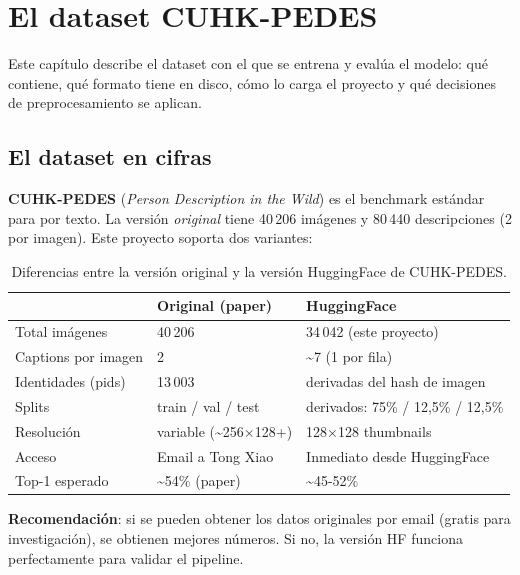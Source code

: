\chapter{El dataset CUHK-PEDES}
\label{cap:dataset}

Este capítulo describe el dataset con el que se entrena y evalúa
el modelo: qué contiene, qué formato tiene en disco, cómo lo
carga el proyecto y qué decisiones de preprocesamiento se
aplican.

\section{El dataset en cifras}

\textbf{CUHK-PEDES} (\emph{Person Description in the Wild})
\cite{li2017personsearch} es el benchmark estándar para
\reid{} por texto. La versión \emph{original} tiene 40\,206
imágenes y 80\,440 descripciones (2 por imagen). Este proyecto
soporta dos variantes:

\begin{table}[H]
\centering
\caption{Diferencias entre la versión original y la versión
HuggingFace de CUHK-PEDES.}
\label{tab:cuhk-versions}
\begin{tabularx}{\textwidth}{lXX}
\toprule
 & \textbf{Original (paper)} & \textbf{HuggingFace} \\
\midrule
Total imágenes
  & 40\,206
  & 34\,042 \footnotesize(este proyecto) \\
Captions por imagen
  & 2
  & \textasciitilde 7 (1 por fila) \\
Identidades (pids)
  & 13\,003
  & derivadas del hash de imagen \\
Splits
  & train / val / test
  & derivados: 75\% / 12,5\% / 12,5\% \\
Resolución
  & variable (\textasciitilde 256×128+)
  & 128×128 thumbnails \\
Acceso
  & Email a Tong Xiao
  & Inmediato desde HuggingFace \\
Top-1 esperado
  & \textasciitilde 54\% (paper)
  & \textasciitilde 45-52\% \\
\bottomrule
\end{tabularx}
\end{table}

\noindent\textbf{Recomendación}: si se pueden obtener los datos
originales por email (gratis para investigación), se obtienen
mejores números. Si no, la versión HF funciona perfectamente
para validar el pipeline.

